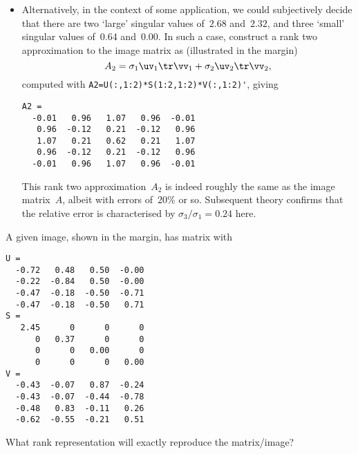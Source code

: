 \begin{example}
\begin{solution}
\begin{itemize}
\item Alternatively, in the context of some application, we could subjectively decide that there are two `large' singular values of~\(2.68\) and~\(2.32\), and three `small' singular values of~\(0.64\) and~\(0.00\).
In such a case, construct a rank two approximation to the image matrix as (illustrated in the margin)
\marginpar{}
\begin{equation*}
A_2=\sigma_1\uv_1\tr\vv_1+\sigma_2\uv_2\tr\vv_2,
\end{equation*}
computed with \verb|A2=U(:,1:2)*S(1:2,1:2)*V(:,1:2)'|, giving \twodp
\begin{verbatim}
A2 =
  -0.01   0.96   1.07   0.96  -0.01
   0.96  -0.12   0.21  -0.12   0.96
   1.07   0.21   0.62   0.21   1.07
   0.96  -0.12   0.21  -0.12   0.96
  -0.01   0.96   1.07   0.96  -0.01
\end{verbatim}
This rank two approximation~\(A_2\) is indeed roughly the same as the image matrix~\(A\), albeit with errors of~20\% or so.
Subsequent theory confirms that the relative error is characterised by \(\sigma_3/\sigma_1=0.24\) here.
\end{itemize}
\end{solution}
\end{example}




\begin{activity}
A given image, shown in the margin, has matrix with \svd\ \twodp
\marginpar{}%
\begin{verbatim}
U =
  -0.72   0.48   0.50  -0.00
  -0.22  -0.84   0.50  -0.00
  -0.47  -0.18  -0.50  -0.71
  -0.47  -0.18  -0.50   0.71
S =
   2.45      0      0      0
      0   0.37      0      0
      0      0   0.00      0
      0      0      0   0.00
V =
  -0.43  -0.07   0.87  -0.24
  -0.43  -0.07  -0.44  -0.78
  -0.48   0.83  -0.11   0.26
  -0.62  -0.55  -0.21   0.51
\end{verbatim}
What rank representation will exactly reproduce the matrix\slash image?
\end{activity}





